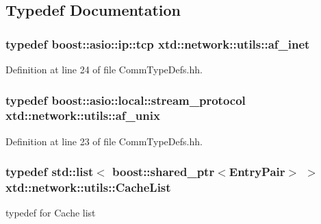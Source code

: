 \subsection{Typedef Documentation}
\subsubsection[{\texorpdfstring{af\+\_\+inet}{af_inet}}]{\setlength{\rightskip}{0pt plus 5cm}typedef boost\+::asio\+::ip\+::tcp {\bf xtd\+::network\+::utils\+::af\+\_\+inet}}\hypertarget{namespacextd_1_1network_1_1utils_a6238bab7a616eda8c9424721444a18d1}{}\label{namespacextd_1_1network_1_1utils_a6238bab7a616eda8c9424721444a18d1}


Definition at line 24 of file Comm\+Type\+Defs.\+hh.

\subsubsection[{\texorpdfstring{af\+\_\+unix}{af_unix}}]{\setlength{\rightskip}{0pt plus 5cm}typedef boost\+::asio\+::local\+::stream\+\_\+protocol {\bf xtd\+::network\+::utils\+::af\+\_\+unix}}\hypertarget{namespacextd_1_1network_1_1utils_a60e83921a2d026f07b49fa094988acdf}{}\label{namespacextd_1_1network_1_1utils_a60e83921a2d026f07b49fa094988acdf}


Definition at line 23 of file Comm\+Type\+Defs.\+hh.

\subsubsection[{\texorpdfstring{Cache\+List}{CacheList}}]{\setlength{\rightskip}{0pt plus 5cm}typedef std\+::list$<$ boost\+::shared\+\_\+ptr$<${\bf Entry\+Pair}$>$ $>$ {\bf xtd\+::network\+::utils\+::\+Cache\+List}}\hypertarget{namespacextd_1_1network_1_1utils_a6eef494cdc6ca2b10bf4f36f6fa110ee}{}\label{namespacextd_1_1network_1_1utils_a6eef494cdc6ca2b10bf4f36f6fa110ee}


typedef for Cache list 




